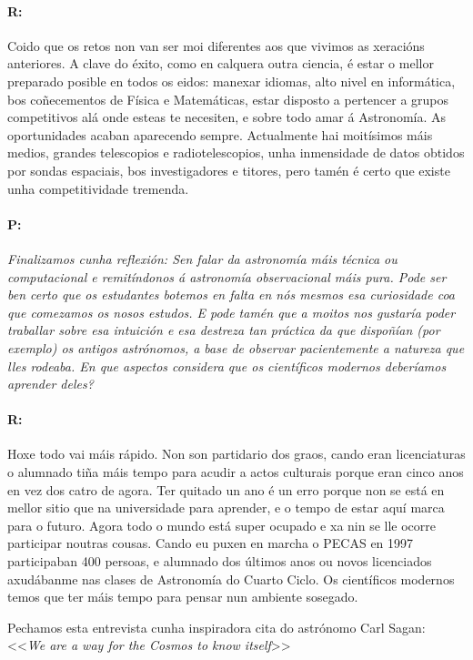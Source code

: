 \begin{multicols}{2}
\paragraph{R:}

Coido que os retos non van ser moi diferentes aos que vivimos as
xeracións anteriores. A clave do éxito, como en calquera outra ciencia, é estar
o mellor preparado posible en todos os eidos: manexar idiomas, alto nivel en
informática, bos coñecementos de Física e Matemáticas, estar disposto a
pertencer a grupos competitivos alá onde esteas te necesiten, e sobre todo amar
á Astronomía. As oportunidades acaban aparecendo sempre. Actualmente hai
moitísimos máis medios, grandes telescopios e radiotelescopios, unha
inmensidade de datos obtidos por sondas espaciais, bos investigadores e
titores, pero tamén é certo que existe unha competitividade tremenda.

\paragraph{P:}

\textit{Finalizamos cunha reflexión: Sen falar da astronomía máis técnica ou
computacional e remitíndonos á astronomía observacional máis pura. Pode ser ben
certo que os estudantes botemos en falta en nós mesmos esa curiosidade coa que
comezamos os nosos estudos. E pode tamén que a moitos nos gustaría poder
traballar sobre esa intuición e esa destreza tan práctica da que dispoñían (por
exemplo) os antigos astrónomos, a base de observar pacientemente a natureza que
lles rodeaba. En que aspectos considera que os científicos modernos deberíamos
aprender deles? }

\paragraph{R:}

Hoxe todo vai máis rápido. Non son partidario dos graos, cando eran
licenciaturas o alumnado tiña máis tempo para acudir a actos culturais porque
eran cinco anos en vez dos catro de agora. Ter quitado un ano é un erro porque
non se está en mellor sitio que na universidade para aprender, e o tempo de
estar aquí marca para o futuro. Agora todo o mundo está super ocupado e xa nin
se lle ocorre participar noutras cousas. Cando eu puxen en marcha o PECAS en
1997 participaban 400 persoas, e alumnado dos últimos anos ou novos licenciados
axudábanme nas clases de Astronomía do Cuarto Ciclo. Os científicos modernos
temos que ter máis tempo para pensar nun ambiente sosegado.

\vspace{3em}

Pechamos esta entrevista cunha inspiradora cita do astrónomo Carl Sagan:
<<\textit{We are a way for the Cosmos to know itself}>>
\end{multicols}
